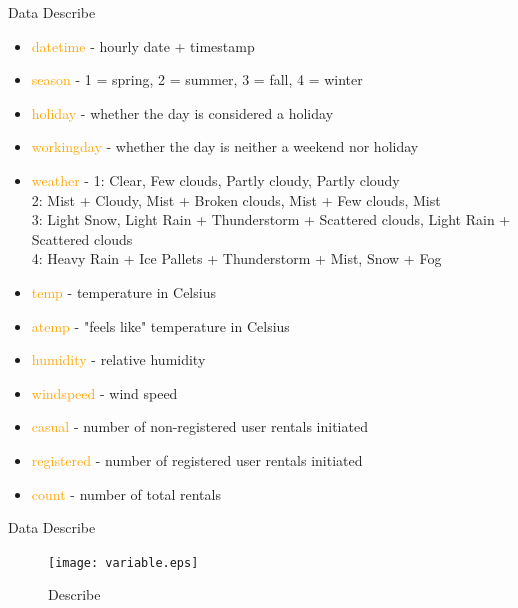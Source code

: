 \documentclass[
size=14pt,
paper=smartboard,  %
mode=present, 		%
display=slides, 	%
style=tuliplab,  	%
pauseslide,
fleqn,leqno]{powerdot}
\begin{document}
	\begin{slide}[toc=,bm=]{Data Describe}
		
		\begin{itemize}
			\item \textcolor{orange}{datetime} - hourly date + timestamp
			\item \textcolor{orange}{season} - 1 = spring, 2 = summer, 3 = fall, 4 = winter 
			\item \textcolor{orange}{holiday} - whether the day is considered a holiday
			\item \textcolor{orange}{workingday}  - whether the day is neither a weekend nor holiday
			\item \textcolor{orange}{weather} - 1: Clear, Few clouds, Partly cloudy, Partly cloudy
			\\2: Mist + Cloudy, Mist + Broken clouds, Mist + Few clouds, Mist
			\\3: Light Snow, Light Rain + Thunderstorm + Scattered clouds, Light Rain + Scattered clouds
			\\4: Heavy Rain + Ice Pallets + Thunderstorm + Mist, Snow + Fog
			\item \textcolor{orange}{temp} - temperature in Celsius
			\item \textcolor{orange}{atemp} - "feels like" temperature in Celsius
			\item \textcolor{orange}{humidity} - relative humidity
			\item \textcolor{orange}{windspeed} - wind speed
			\item \textcolor{orange}{casual} - number of non-registered user rentals initiated
			\item \textcolor{orange}{registered} - number of registered user rentals initiated
			\item \textcolor{orange}{count} - number of total rentals
		\end{itemize}
		
	\end{slide}
	\begin{slide}[toc=,bm=]{Data Describe}
		\begin{figure}
			\centering
			\texttt{[image: variable.eps]}
			\caption{Describe} \label{framework}
		\end{figure}
	\end{slide}
	
\end{document}
